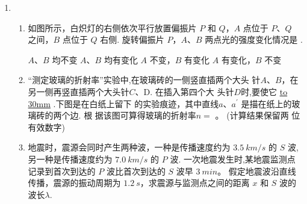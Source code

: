 \begin{enumerate}
\begin{enumerate}
\end{enumerate}


\item 
{}
\begin{enumerate}
	\item
如图所示，白炽灯的右侧依次平行放置偏振片 $ P $ 和 $ Q $，$ A $ 点位于 $ P $、$ Q $ 之间，$ B $ 点位于
$ Q $ 右侧. 旋转偏振片 $ P $，$ A $、$ B $ 两点光的强度变化情况是 \underlinegap .
\begin{figure}[h!]
	\centering
	
\end{figure}

\fourchoices
{$A $、$ B $ 均不变}
{$A $、$ B $ 均有变化}
{$A $ 不变，$ B $ 有变化}
{$A $ 有变化，$ B $ 不变}



\item 
“测定玻璃的折射率”实验中,在玻璃砖的一侧竖直插两个大头
针$ A $、$ B $，在另一侧再竖直插两个大头针$ C $、D. 在插入第四个大
头针$ D $时,要使它 \underline{\hbox to 30mm{}}  .下图是在白纸上留下
的实验痕迹，其中直线$ a $、$ a ^{\prime} $ 是描在纸上的玻璃砖的两个边. 根
据该图可算得玻璃的折射率$ n= $ \underlinegap 。 (计算结果保留两
位有效数字)
\begin{figure}[h!]
	\centering
	
\end{figure}




\item 
地震时，震源会同时产生两种波，一种是传播速度约为 $ 3.5 \ km /s $ 的 $ S $ 波,另一种是传播速度约为
$ 7.0 \ km /s $ 的 $ P $ 波. 一次地震发生时,某地震监测点记录到首次到达的 $ P $ 波比首次到达的 $ S $ 波早 $ 3 \ min $。
假定地震波沿直线传播，震源的振动周期为 $ 1.2 \ s $，求震源与监测点之间的距离 $ x $ 和 $ S $ 波的波长$ \lambda $.




\end{enumerate}


\end{enumerate}
